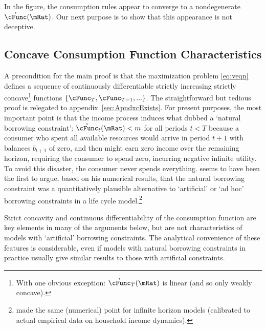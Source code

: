 \documentclass[BufferStockTheory]{subfiles}
\begin{document}
\hypertarget{Calibration}{}



\hypertarget{Symbols}{}



\providecommand{\figName}{Convergence-of-the-Consumption-Rules} %
\providecommand{\figFile}{cFuncsConverge} %
\hypertarget{\figFile}{}
\hypertarget{\figName}{}

In the figure, the consumption rules appear to converge to a nondegenerate $\mathring{\cFunc}(\mRat)$.  
Our next purpose is to show that this appearance is not deceptive.

\hypertarget{Concave-Consumption-Function-Characteristics}{}
\subsection{Concave Consumption Function Characteristics}\label{sec:cExists}

A precondition for the main proof is that the maximization problem \eqref{eq:veqn} defines a sequence of continuously differentiable strictly increasing strictly concave\footnote{With one obvious exception: $\mathring{\cFunc}_{T}(\mRat)$ is linear (and so only weakly concave).} functions $\{\cFunc_{T},\cFunc_{T-1},...\}$.  The straightforward but tedious proof is relegated to appendix~\ref{sec:ApndxcExists}.  For present purposes, the most important point is that the income process induces what \cite{aiyagari:ge} dubbed a `natural borrowing constraint':  $\mathring{\cFunc}_{t}(\mRat) < m$ for all periods $t < T$ because a consumer who spent all available resources would arrive in period $t+1$ with balances $b_{t+1}$ of zero, and then might earn zero income over the remaining horizon, requiring the consumer to spend zero, incurring negative infinite utility.  To avoid this disaster, the consumer never spends everything.  \cite{zeldesStochastic} seems to have been the first to argue, based on his numerical results, that the natural borrowing constraint was a quantitatively plausible alternative to `artificial' or `ad hoc' borrowing constraints in a life cycle model.\footnote{\cite{carrollBrookings} made the same (numerical) point for infinite horizon models (calibrated to actual empirical data on household income dynamics).}

Strict concavity and continuous differentiability of the consumption function are key elements in many of the arguments below, but are not characteristics of models with `artificial' borrowing constraints.  The analytical convenience of these features is considerable, even if models with natural borrowing constraints in practice usually give similar results to those with artificial constraints.
\end{document}
